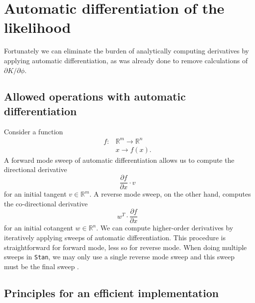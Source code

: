 \documentclass[stslayout, noinfoline]{imsart}
\theoremstyle{definition}
\begin{document}
\section{Automatic differentiation of the likelihood}

Fortunately we can eliminate the burden of analytically computing derivatives by applying automatic differentiation, as was already done to remove calculations of $\partial K / \partial \phi$.

\subsection{Allowed operations with automatic differentiation}

Consider a function
\begin{eqnarray*}
  f : & \mathbb R^m \to \mathbb R^n \\
     & x \to f(x).
\end{eqnarray*}
A forward mode sweep of automatic differentiation allows us to compute the directional derivative
\begin{equation*}
  \frac{\partial f}{\partial x} \cdot v
\end{equation*}
for an initial tangent $v \in \mathbb R^m$.
A reverse mode sweep, on the other hand, computes the co-directional derivative
\begin{equation*}
w^T \cdot \frac{\partial f}{\partial x}
\end{equation*}
for an initial cotangent $w \in \mathbb R^n$.
We can compute higher-order derivatives by iteratively applying sweeps of automatic differentiation.
%
This procedure is straightforward for forward mode, less so for reverse mode.
When doing multiple sweeps in \texttt{Stan}, we may only use a single reverse mode sweep
and this sweep must be the final sweep \citep{Carpenter:2015}.

\subsection{Principles for an efficient implementation}
\end{document}
